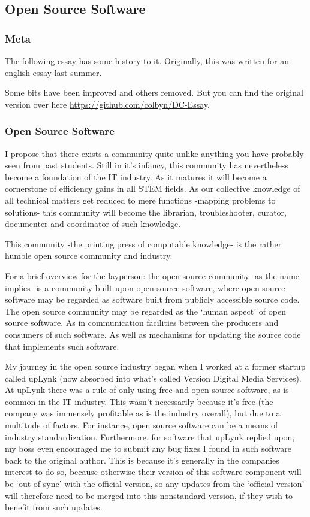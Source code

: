 \subsection*{Open Source Software}

\subsubsection*{Meta}
The following essay has some history to it. Originally, this was written for an english essay last summer. 

Some bits have been improved and others removed. But you can find the original version over here \url{https://github.com/colbyn/DC-Essay}.


\subsubsection*{Open Source Software}


I propose that there exists a community quite unlike anything you have probably seen from past students. Still in it’s infancy, this community has nevertheless become a foundation of the IT industry. As it matures it will become a cornerstone of efficiency gains in all STEM fields. As our collective knowledge of all technical matters get reduced to mere functions -mapping problems to solutions- this community will become the librarian, troubleshooter, curator, documenter and coordinator of such knowledge.

This community -the printing press of computable knowledge- is the rather humble open source community and industry.

For a brief overview for the layperson: the open source community -as the name implies- is a community built upon open source software, where open source software may be regarded as software built from publicly accessible source code. The open source community may be regarded as the ‘human aspect’ of open source software. As in communication facilities between the producers and consumers of such software. As well as mechanisms for updating the source code that implements such software.

My journey in the open source industry began when I worked at a former startup called upLynk (now absorbed into what's called Version Digital Media Services). At upLynk there was a rule of only using free and open source software, as is common in the IT industry. This wasn’t necessarily because it’s free (the company was immensely profitable as is the industry overall), but due to a multitude of factors. For instance, open source software can be a means of industry standardization. Furthermore, for software that upLynk replied upon, my boss even encouraged me to submit any bug fixes I found in such software back to the original author. This is because it’s generally in the companies interest to do so, because otherwise their version of this software component will be ‘out of sync’ with the official version, so any updates from the ‘official version’ will therefore need to be merged into this nonstandard version, if they wish to benefit from such updates.

